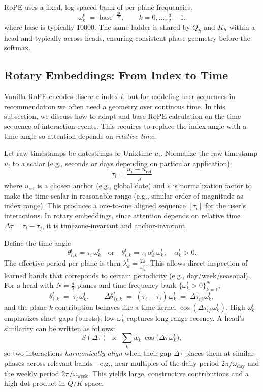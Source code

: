 \documentclass[sigconf]{acmart}
\begin{document}
RoPE uses a fixed, log-spaced bank of per-plane frequencies.
\begin{equation}
\label{eq:freq-bank}
\omega^{p}_k \;=\; \text{base}^{-\frac{2k}{d}},\qquad k=0,\ldots,\tfrac{d}{2}-1.
\end{equation}
where  $\text{base}$ is typically $10000$. The same ladder is shared by $Q_h$ and $K_h$ within a head and typically across heads, ensuring consistent phase geometry before the softmax.





\subsection{Rotary Embeddings: From Index to Time}
\label{subsec:time-only-rope}
Vanilla RoPE encodes discrete index $i$, but for modeling user sequences in recommendation we often need a geometry over continous time. In this subsection, we discuss how to adapt and base RoPE calculation on the time sequence of interaction events. This requires to replace the index angle with a time angle so attention depends on \emph{relative time}.

Let raw timestamps be datestrings or Unixtime $u_i$. Normalize the raw timestamp $u_i$ to a scalar (e.g., seconds or days depending on particular application):
\[
\tau_i=\frac{u_i-u_{\mathrm{ref}}}{s}
\]
where $u_{\mathrm{ref}}$ is a chosen anchor (e.g., global date) and $s$ is normalization factor to make the time scalar in reasonable range (e.g., similar order of magnitude as index range). This produces a one-to-one aligned sequence $[\tau_i]$ for the user’s interactions. In rotary embeddings, since attention depends on relative time $\Delta\tau = \tau_i-\tau_j$, it is timezone-invariant and anchor-invariant. 


Define the time angle
\[
\theta^t_{i,k}=\tau_i\,\omega^t_k \quad \text{or} \quad \theta^t_{i,k}=\tau_i\,\alpha^t_k\,\omega^t_k,\quad \alpha^t_k>0.
\]
The effective period per plane is then $\lambda^{\mathrm{t}}_k=\frac{2\pi}{\omega^t_k}$. This allows direct inspection of learned  bands that correponds to certain periodicity (e.g., day/week/seasonal). For a head with $N=\tfrac{d}{2}$ planes and time frequency bank $\{\omega^t_k>0\}_{k=1}^{N}$,
\[
\theta^t_{i,k} \;=\; \tau_i\,\omega^t_k,\qquad
\Delta\theta^t_{ij,k} \;=\; (\tau_i-\tau_j)\,\omega^t_k \;=\; \Delta\tau_{ij}\,\omega^t_k,
\]
and the plane-$k$ contribution behaves like a time kernel
$\cos(\Delta\tau_{ij}\,\omega^t_k)$.
High $\omega^t_k$ emphasizes short gaps (bursts); low $\omega^t_k$ captures long-range recency. A head’s similarity can be written as follows:
\[
S(\Delta\tau)\;\propto\;\sum_{k} w_k\,\cos\!\big(\Delta\tau\,\omega^t_k\big),
\]
so two interactions \emph{harmonically align} when their gap $\Delta\tau$ places them at similar phases across relevant bands—e.g., near multiples of the daily period $2\pi/\omega_{\text{day}}$ and the weekly period $2\pi/\omega_{\text{week}}$. This yields large, constructive contributions and a high dot product in $Q/K$ space.
\end{document}
